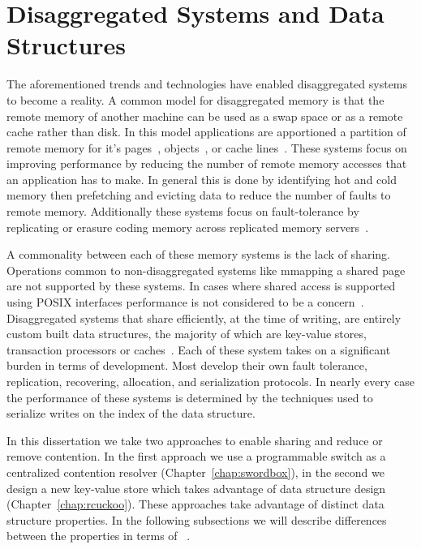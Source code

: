 \documentclass[12pt]{ucsddissertation}
\begin{document}
\section{Disaggregated Systems and Data Structures}

The aforementioned trends and technologies have enabled disaggregated systems to become a reality.
A common model for disaggregated memory is that the remote memory of another machine can be used as
a swap space or as a remote cache rather than disk. In this model applications are apportioned a
partition of remote memory for it's pages~\cite{infiniswap,fastswap,leap,blade-server,legoos,hydra},
objects~\cite{aifm,carbink}, or cache lines~\cite{kona}. These systems focus on improving
performance by reducing the number of remote memory accesses that an application has to make. In
general this is done by identifying hot and cold memory then prefetching and evicting data to reduce
the number of faults to remote memory.  Additionally these systems focus on fault-tolerance by
replicating or erasure coding memory across replicated memory servers~\cite{hydra}.

A commonality between each of these memory systems is the lack of sharing. Operations common to
non-disaggregated systems like mmapping a shared page are not supported by these systems. In cases
where shared access is supported using POSIX interfaces performance is not considered to be a
concern~\cite{Regions}. Disaggregated systems that share efficiently, at the time of writing, are
entirely custom built data structures, the majority of which are key-value stores, transaction
processors or caches~\cite{clover, sherman, race, fusee, rolex, ford, ditto}. Each of these system
takes on a significant burden in terms of development. Most develop their own fault tolerance,
replication, recovering, allocation, and serialization protocols. In nearly every case the
performance of these systems is determined by the techniques used to serialize writes on the index
of the data structure.

In this dissertation we take two approaches to enable sharing and reduce or remove contention. In
the first approach we use a programmable switch as a centralized contention resolver
(Chapter~\ref{chap:swordbox}), in the second we design a new key-value store which takes advantage
of data structure design (Chapter~\ref{chap:rcuckoo}). These approaches take advantage of distinct
data structure properties. In the following subsections we will describe differences between the
properties in terms of ~.
\end{document}
